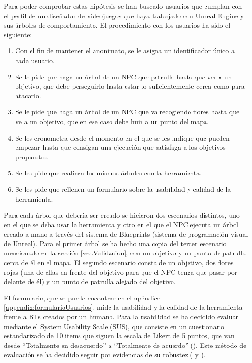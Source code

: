 Para poder comprobar estas hipótesis se han buscado usuarios que cumplan con el perfil de un diseñador de videojuegos que haya trabajado con Unreal Engine y sus árboles de comportamiento.
El procedimiento con los usuarios ha sido el siguiente:
\begin{enumerate}
    \item Con el fin de mantener el anonimato, se le asigna un identificador único a cada usuario.
    \item Se le pide que haga un árbol de un NPC que patrulla hasta que ver a un objetivo, que debe perseguirlo hasta estar lo suficientemente cerca como para atacarlo.
    \item Se le pide que haga un árbol de un NPC que va recogiendo flores hasta que ve a un objetivo, que en ese caso debe huir a un punto del mapa.
    \item Se les cronometra desde el momento en el que se les indique que pueden empezar hasta que consigan una ejecución que satisfaga a los objetivos propuestos.
    \item Se les pide que realicen los mismos árboles con la herramienta.
    \item Se les pide que rellenen un formulario sobre la usabilidad y calidad de la herramienta.
\end{enumerate}

Para cada árbol que debería ser creado se hicieron dos escenarios distintos, uno en el que se deba usar la herramienta y otro en el que el NPC ejecuta un árbol creado a mano a través del sistema de Blueprints (sistema de programación visual de Unreal).
Para el primer árbol se ha hecho una copia del tercer escenario mencionado en la sección \ref{sec:Validacion}, con un objetivo y un punto de patrulla cerca de él en el mapa.
El segundo escenario consta de un objetivo, dos flores rojas (una de ellas en frente del objetivo para que el NPC tenga que pasar por delante de él) y un punto de patrulla alejado del objetivo.

El formulario, que se puede encontrar en el apéndice \ref{appendix:formularioUsuarios}, mide la usabilidad y la calidad de la herramienta frente a BTs creados por un humano.
Para la usabilidad se ha decidido evaluar mediante el System Usability Scale (SUS), que consiste en un cuestionario estandarizado de 10 items que siguen la escala de Likert de 5 puntos, que van desde ``Totalmente en desacuerdo'' a ``Totalmente de acuerdo'' (\cite{sus}).
Este método de evaluación se ha decidido seguir por evidencias de su robustez (\cite{Bangor} y \cite{ValSUS}).

